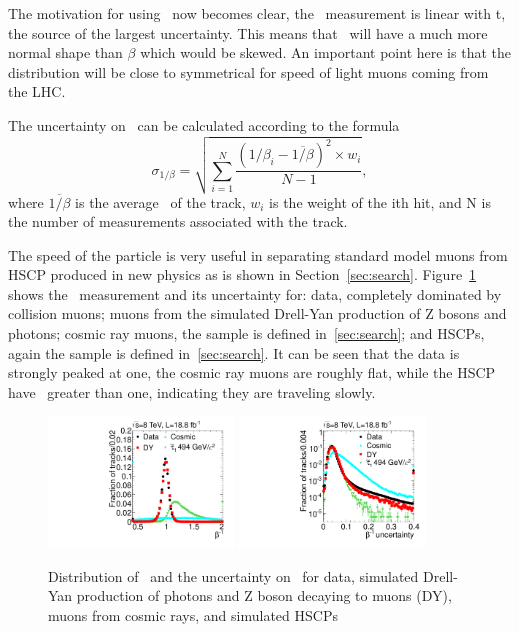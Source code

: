 The motivation for using \invbeta\ now becomes clear, the \invbeta\ measurement
is linear with t, the source of the largest uncertainty. This means that \invbeta\ will have a much more normal shape than $\beta$ which would be skewed.
An important point here is that the distribution will be close to symmetrical for speed of light muons coming from the LHC.

The uncertainty on \invbeta\ can be calculated according to the formula
\begin{equation}
 \sigma_{1/\beta} = \sqrt{\sum_{i=1}^N \frac{(1/\beta_i - \overline{1/\beta})^2 \times w_{i}}{N-1}},
 \label{betaerr}
\end{equation}
where $\overline{1/\beta}$ is the average \invbeta\ of the track, $w_{i}$ is the weight of the ith hit, and N is the number of measurements associated with the track.

The speed of the particle is very useful in separating standard model muons from HSCP produced in new physics as is shown in Section~\ref{sec:search}.
Figure~\ref{fig:invbeta} shows the \invbeta\ measurement and its uncertainty for: data, completely dominated by collision muons; 
muons from the simulated Drell-Yan production of Z bosons and photons; cosmic ray muons, the sample is defined in~\ref{sec:search};
and HSCPs, again the sample is defined in~\ref{sec:search}. It can be seen that the data is strongly peaked at one, the cosmic ray muons are roughly flat, while
the HSCP have \invbeta\ greater than one, indicating they are traveling slowly.

\begin{figure}
  \begin{center}
      \includegraphics[width=0.44\textwidth]{figures/timing/TOF}
      \includegraphics[width=0.44\textwidth]{figures/timing/TOFErr} \\
      \caption[Distribution of \invbeta\ and the uncertainty on \invbeta]
      {Distribution of \invbeta\ and the uncertainty on \invbeta\ for data,
simulated Drell-Yan production of photons and Z boson decaying to muons (DY), muons from cosmic rays, and simulated HSCPs
        }
      \label{fig:invbeta}
  \end{center}
\end{figure}


